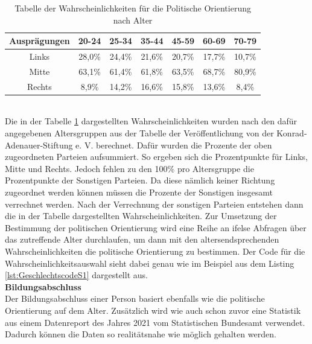 \begin{onehalfspace}
\begin{table}[!h]
    \centering
    \begin{tabular}{|c|c|c|c|c|c|c|}
    \hline
    \textbf{Ausprägungen} & \textbf{20-24} & \textbf{25-34} & \textbf{35-44} & \textbf{45-59} & \textbf{60-69} & \textbf{70-79} \\ \hline
    Links                 & 28,0\%         & 24,4\%         & 21,6\%         & 20,7\%         & 17,7\%         & 10,7\%         \\ \hline
    Mitte                 & 63,1\%         & 61,4\%         & 61,8\%         & 63,5\%         & 68,7\%         & 80,9\%         \\ \hline
    Rechts                & 8,9\%          & 14,2\%         & 16,6\%         & 15,8\%         & 13,6\%         & 8,4\%          \\ \hline
    \end{tabular}
    \caption{Tabelle der Wahrscheinlichkeiten für die Politische Orientierung nach Alter}
    \label{table:7}
\end{table}\\
Die in der Tabelle \ref{table:7} dargestellten Wahrscheinlichkeiten wurden nach den dafür angegebenen Altersgruppen aus der Tabelle der Veröffentlichung von der Konrad-Adenauer-Stiftung e. V. berechnet. Dafür wurden die Prozente der oben zugeordneten Parteien aufsummiert. So ergeben sich die Prozentpunkte für Links, Mitte und Rechts. Jedoch fehlen zu den 100\% pro Altersgruppe die Prozentpunkte der Sonstigen Parteien. Da diese nämlich keiner Richtung zugeordnet werden können müssen die Prozente der Sonstigen insgesamt verrechnet werden. Nach der Verrechnung der sonstigen Parteien entstehen dann die in der Tabelle dargestellten Wahrscheinlichkeiten.\cite[S. 33]{konrad-adenauer-stiftung2021} Zur Umsetzung der Bestimmung der politischen Orientierung wird eine Reihe an ifelse Abfragen über das zutreffende Alter durchlaufen, um dann mit den altersendsprechenden Wahrscheinlichkeiten die politische Orientierung zu bestimmen. Der Code für die Wahrscheinlichkeitsauswahl sieht dabei genau wie im Beispiel aus dem Listing \ref{lst:GeschlechtscodeS1} dargestellt aus.\\
\textbf{Bildungsabschluss}\\
Der Bildungsabschluss einer Person basiert ebenfalls wie die politische Orientierung auf dem Alter. Zusätzlich wird wie auch schon zuvor eine Statistik aus einem Datenreport des Jahres 2021 vom Statistischen Bundesamt verwendet. \cite{destatis2021} Dadurch können die Daten so realitätsnahe wie möglich gehalten werden.\\ 

\end{onehalfspace}
